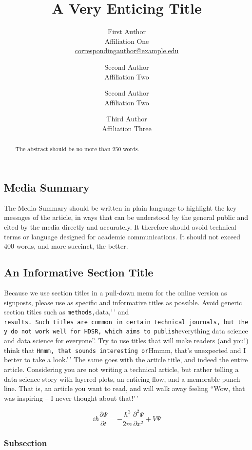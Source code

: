 \documentclass[
]{hdsr}
\title{A Very Enticing Title}
\author{
First Author\\Affiliation
One\\\href{mailto:correspondingauthor@example.edu}{correspondingauthor@example.edu}\and 
Second Author\\Affiliation Two\\\and 
Second Author\\Affiliation Two\\\and 
Third Author\\Affiliation Three\\}
\date{}
\begin{document}
\maketitle
\begin{abstract}
The abstract should be no more than 250 words.
\end{abstract}
\hypertarget{media-summary}{%
\subsection*{Media Summary}\label{media-summary}}

The Media Summary should be written in plain language to highlight the
key messages of the article, in ways that can be understood by the
general public and cited by the media directly and accurately. It
therefore should avoid technical terms or language designed for academic
communications. It should not exceed 400 words, and more succinct, the
better.

\hypertarget{sec-sec1}{%
\subsection{An Informative Section Title}\label{sec-sec1}}

Because we use section titles in a pull-down menu for the online version
as signposts, please use as specific and informative titles as possible.
Avoid generic section titles such as
\texttt{methods,\textquotesingle{}\textquotesingle{}}data,'\,' and
\texttt{results\textquotesingle{}\textquotesingle{}.\ Such\ titles\ are\ common\ in\ certain\ technical\ journals,\ but\ they\ do\ not\ work\ well\ for\ HDSR,\ which\ aims\ to\ publish}everything
data science and data science for everyone''. Try to use titles that
will make readers (and you!) think that
\texttt{Hmmm,\ that\ sounds\ interesting\textquotesingle{}\textquotesingle{}\ or}Hmmm,
that's unexpected and I better to take a look.'\,' The same goes with
the article title, and indeed the entire article. Considering you are
not writing a technical article, but rather telling a data science story
with layered plots, an enticing flow, and a memorable punch line. That
is, an article you want to read, and will walk away feeling ``Wow, that
was inspiring -- I never thought about that!'\,'

\[
    i\hbar \frac{\partial \Psi}{\partial t} = -\frac{\hbar^2}{2m}\frac{\partial^2 \Psi}{\partial x^2} + V \Psi
\]

\hypertarget{subsection}{%
\subsubsection{Subsection}\label{subsection}}
\end{document}
